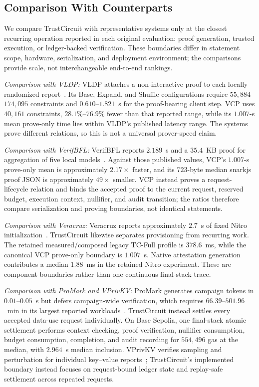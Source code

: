 \documentclass[10pt,journal,compsoc]{IEEEtran}
\begin{document}
\subsection{Comparison With Counterparts}
\label{subsec:cross_system_enforcement}

We compare TrustCircuit with representative systems only at the closest recurring operation reported in each original evaluation: proof generation, trusted execution, or ledger-backed verification. These boundaries differ in statement scope, hardware, serialization, and deployment environment; the comparisons provide scale, not interchangeable end-to-end rankings.

\textit{Comparison with VLDP:} VLDP attaches a non-interactive proof to each locally randomized report~\cite{bontekoe2024efficient}. Its Base, Expand, and Shuffle configurations require $55{,}884$--$174{,}095$ constraints and $0.610$--$1.821$~s for the proof-bearing client step. VCP uses $40{,}161$ constraints, $28.1\%$--$76.9\%$ fewer than that reported range, while its $1.007$-s mean prove-only time lies within VLDP's published latency range. The systems prove different relations, so this is not a universal prover-speed claim.

\textit{Comparison with VerifBFL:} VerifBFL reports $2.189$~s and a $35.4$~KB proof for aggregation of five local models~\cite{bellachia2025verifbfl}. Against those published values, VCP's $1.007$-s prove-only mean is approximately $2.17\times$ faster, and its $723$-byte median snarkjs proof JSON is approximately $49\times$ smaller. VCP instead proves a request-lifecycle relation and binds the accepted proof to the current request, reserved budget, execution context, nullifier, and audit transition; the ratios therefore compare serialization and proving boundaries, not identical statements.

\textit{Comparison with Veracruz:} Veracruz reports approximately $2.7$~s of fixed Nitro initialization~\cite{brossard2023private}. TrustCircuit likewise separates provisioning from recurring work. The retained measured/composed legacy \textsf{TC-Full} profile is $378.6$~ms, while the canonical VCP prove-only boundary is $1.007$~s. Native attestation generation contributes a median $1.88$~ms in the retained Nitro experiment. These are component boundaries rather than one continuous final-stack trace.

\textit{Comparison with ProMark and VPrivKV:} ProMark generates campaign tokens in $0.01$--$0.05$~s but defers campaign-wide verification, which requires $66.39$--$501.96$~min in its largest reported workloads~\cite{hoang2024promark}. TrustCircuit instead settles every accepted data-use request individually. On Base Sepolia, one final-stack atomic settlement performs context checking, proof verification, nullifier consumption, budget consumption, completion, and audit recording for $554{,}496$ gas at the median, with $2.964$~s median inclusion. VPrivKV verifies sampling and perturbation for individual key--value reports~\cite{zhou2025vprivkv}; TrustCircuit's implemented boundary instead focuses on request-bound ledger state and replay-safe settlement across repeated requests.
\end{document}
